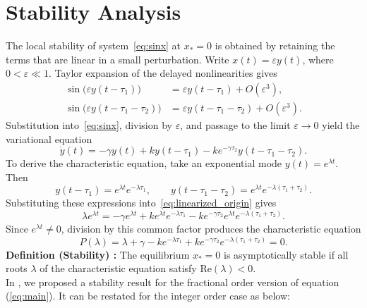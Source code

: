 \documentclass[11pt]{article}
\theoremstyle{remark}
\begin{document}
\section{Stability Analysis}
\label{sec:stability}
The local stability of system~\eqref{eq:sinx} at $x_*=0$ is obtained by retaining the terms that are linear in a small perturbation. Write $x(t)=\varepsilon y(t)$, where $0<\varepsilon\ll1$. Taylor expansion of the delayed nonlinearities gives
\begin{align*}
	\sin\bigl(\varepsilon y(t-\tau_1)\bigr)
	&=\varepsilon y(t-\tau_1)+O(\varepsilon^3),\\
	\sin\bigl(\varepsilon y(t-\tau_1-\tau_2)\bigr)
	&=\varepsilon y(t-\tau_1-\tau_2)+O(\varepsilon^3).
\end{align*}
Substitution into~\eqref{eq:sinx}, division by $\varepsilon$, and passage to the limit $\varepsilon\to0$ yield the variational equation
\begin{equation}
	\dot y(t)
	=-\gamma y(t)
	+k y(t-\tau_1)
	-k e^{-\gamma\tau_2}y(t-\tau_1-\tau_2).
	\label{eq:linearized_origin}
\end{equation}
To derive the characteristic equation, take an exponential mode $y(t)=e^{\lambda t}$. Then
\[
	y(t-\tau_1)=e^{\lambda t}e^{-\lambda\tau_1},
	\qquad
	y(t-\tau_1-\tau_2)=e^{\lambda t}e^{-\lambda(\tau_1+\tau_2)}.
\]
Substituting these expressions into~\eqref{eq:linearized_origin} gives
\[
	\lambda e^{\lambda t}
	=-\gamma e^{\lambda t}
	+k e^{\lambda t}e^{-\lambda\tau_1}
	-k e^{-\gamma\tau_2}e^{\lambda t}e^{-\lambda(\tau_1+\tau_2)}.
\]
Since $e^{\lambda t}\neq0$, division by this common factor produces the characteristic equation 
\begin{equation}
	P(\lambda)
	=\lambda+\gamma
	-k e^{-\lambda\tau_1}
	+k e^{-\gamma\tau_2}e^{-\lambda(\tau_1+\tau_2)}
	=0.
	\label{eq:characteristic_origin}
\end{equation}
\textbf{Definition (Stability) \cite{lakshmanan2011dynamics}:} The equilibrium $x_* = 0$ is asymptotically stable if all roots $\lambda$ of the characteristic equation satisfy $\text{Re}(\lambda) < 0$.\\
In \cite{dutta2025some}, we proposed a stability result for the fractional order version of equation (\ref{eq:main}). It can be restated for the integer order case as below:
\end{document}
